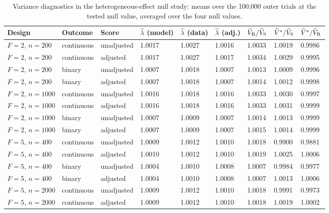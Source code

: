 \begin{table}[!htbp]\centering
\caption{Variance diagnostics in the heterogeneous-effect null study: means over the 100,000 outer trials at the tested null value, averaged over the four null values.}
\label{tab:supp-hetero-diag}
\begin{threeparttable}\begin{singlespace}\footnotesize\setlength{\tabcolsep}{3pt}
\begin{tabular}{@{}lllllllll@{}}\toprule
Design & Outcome & Score & $\widehat\lambda$ (model) & $\widehat\lambda$ (data) & $\widehat\lambda$ (adj.) & $\widehat V_{\rm R}/\widehat V_{\rm S}$ & $\widehat V^{*}/\widehat V_{\rm S}$ & $\widehat V^{*}/\widehat V_{\rm R}$\\\midrule
$F=2$, $n=200$ & continuous & unadjusted & 1.0017 & 1.0027 & 1.0016 & 1.0033 & 1.0019 & 0.9986\\
$F=2$, $n=200$ & continuous & adjusted & 1.0017 & 1.0027 & 1.0017 & 1.0034 & 1.0029 & 0.9995\\
$F=2$, $n=200$ & binary & unadjusted & 1.0007 & 1.0018 & 1.0007 & 1.0013 & 1.0009 & 0.9996\\
$F=2$, $n=200$ & binary & adjusted & 1.0007 & 1.0018 & 1.0007 & 1.0014 & 1.0012 & 0.9998\\
$F=2$, $n=1000$ & continuous & unadjusted & 1.0016 & 1.0018 & 1.0016 & 1.0033 & 1.0030 & 0.9997\\
$F=2$, $n=1000$ & continuous & adjusted & 1.0016 & 1.0018 & 1.0016 & 1.0033 & 1.0031 & 0.9999\\
$F=2$, $n=1000$ & binary & unadjusted & 1.0007 & 1.0009 & 1.0007 & 1.0014 & 1.0013 & 0.9999\\
$F=2$, $n=1000$ & binary & adjusted & 1.0007 & 1.0009 & 1.0007 & 1.0015 & 1.0014 & 0.9999\\
$F=5$, $n=400$ & continuous & unadjusted & 1.0009 & 1.0012 & 1.0010 & 1.0018 & 0.9900 & 0.9881\\
$F=5$, $n=400$ & continuous & adjusted & 1.0010 & 1.0012 & 1.0010 & 1.0019 & 1.0025 & 1.0006\\
$F=5$, $n=400$ & binary & unadjusted & 1.0004 & 1.0010 & 1.0008 & 1.0007 & 0.9984 & 0.9977\\
$F=5$, $n=400$ & binary & adjusted & 1.0004 & 1.0010 & 1.0008 & 1.0007 & 1.0013 & 1.0006\\
$F=5$, $n=2000$ & continuous & unadjusted & 1.0009 & 1.0012 & 1.0010 & 1.0018 & 0.9991 & 0.9973\\
$F=5$, $n=2000$ & continuous & adjusted & 1.0009 & 1.0012 & 1.0010 & 1.0018 & 1.0019 & 1.0002\\

\end{tabular}
\end{singlespace}
\end{threeparttable}
\end{table}
